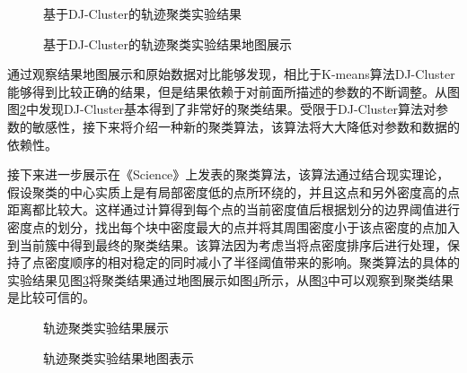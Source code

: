 \begin{figure}[htb]
  \centering%
  \hspace{4em}%
  \caption{基于DJ-Cluster的轨迹聚类实验结果}
  \label{fig:3_10_2}
\end{figure}
\begin{figure}[htb]
  \centering%
  \hspace{4em}%
  \caption{基于DJ-Cluster的轨迹聚类实验结果地图展示}
  \label{fig:3_11_2}
\end{figure}
\par 通过观察结果地图展示和原始数据对比能够发现，相比于K-means算法DJ-Cluster能够得到比较正确的结果，但是结果依赖于对前面所描述的参数的不断调整。从图图\ref{fig:3_11_2}中发现DJ-Cluster基本得到了非常好的聚类结果。受限于DJ-Cluster算法对参数的敏感性，接下来将介绍一种新的聚类算法，该算法将大大降低对参数和数据的依赖性。
\par 接下来进一步展示在《Science》上发表的聚类算法，该算法通过结合现实理论，假设聚类的中心实质上是有局部密度低的点所环绕的，并且这点和另外密度高的点距离都比较大。这样通过计算得到每个点的当前密度值后根据划分的边界阈值进行密度点的划分，找出每个块中密度最大的点并将其周围密度小于该点密度的点加入到当前簇中得到最终的聚类结果。该算法因为考虑当将点密度排序后进行处理，保持了点密度顺序的相对稳定的同时减小了半径阈值带来的影响。聚类算法的具体的实验结果见图\ref{fig:3_12_1}将聚类结果通过地图展示如图\ref{fig:3_13_1}所示，从图\ref{fig:3_12_1}中可以观察到聚类结果是比较可信的。
\begin{figure}[htb]
  \centering%
  \hspace{4em}%
  \caption{轨迹聚类实验结果展示}
  \label{fig:3_12_1}
\end{figure}
\begin{figure}[htb]
  \centering%
  \hspace{4em}%
  \caption{轨迹聚类实验结果地图表示}
  \label{fig:3_13_1}
\end{figure}

